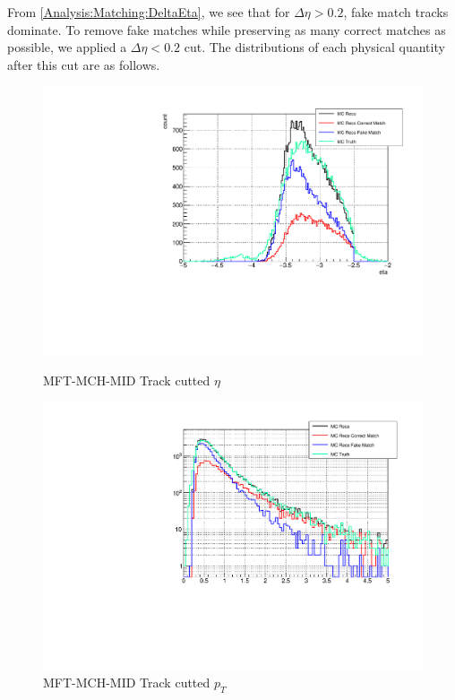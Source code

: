                 From \ref{Analysis:Matching:DeltaEta}, we see that for $\Delta \eta > 0.2$, fake match tracks dominate. 
                To remove fake matches while preserving as many correct matches as possible, we applied a $\Delta \eta < 0.2$ cut. The distributions of each physical quantity after this cut are as follows.
                \begin{figure}[htbp]
                    \centering
                    \begin{minipage}{0.45\textwidth} %
                        \centering
                        \includegraphics[width=\textwidth]{fig/3_3_eta_deltaetacut.pdf} %
                        \caption{MFT-MCH-MID Track cutted $\eta$}
                        \label{Analysis:Matching:eta cutted}
                    \end{minipage}
                    \hfill
                    \begin{minipage}{0.45\textwidth}
                        \centering
                        \includegraphics[width=\textwidth]{fig/3_3_pt_deltaetacut.pdf} %
                        \caption{MFT-MCH-MID Track cutted $p_T$}
                        \label{Analysis:Matching:pt cutted}
                    \end{minipage}
                \end{figure}
